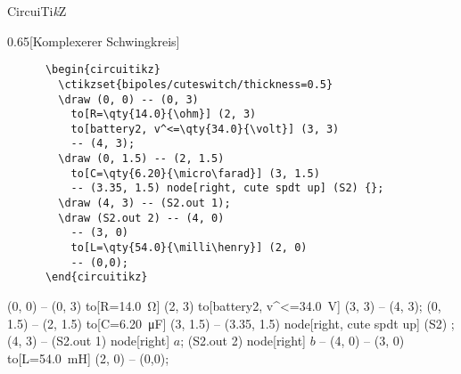 \begin{frame}[fragile]{CircuiTi\textit{k}Z}
  \begin{CodeExample}{0.65}[Komplexerer Schwingkreis]
    \begin{verbatim}
      \begin{circuitikz}
        \ctikzset{bipoles/cuteswitch/thickness=0.5}
        \draw (0, 0) -- (0, 3)
          to[R=\qty{14.0}{\ohm}] (2, 3)
          to[battery2, v^<=\qty{34.0}{\volt}] (3, 3)
          -- (4, 3);
        \draw (0, 1.5) -- (2, 1.5)
          to[C=\qty{6.20}{\micro\farad}] (3, 1.5)
          -- (3.35, 1.5) node[right, cute spdt up] (S2) {};
        \draw (4, 3) -- (S2.out 1);
        \draw (S2.out 2) -- (4, 0)
          -- (3, 0)
          to[L=\qty{54.0}{\milli\henry}] (2, 0)
          -- (0,0);
      \end{circuitikz}
    \end{verbatim}
  \CodeResult
    \begin{circuitikz}
        \draw (0, 0) -- (0, 3)
          to[R=\qty{14.0}{\ohm}] (2, 3)
          to[battery2, v^<=\qty{34.0}{\volt}] (3, 3)
          -- (4, 3);
        \draw (0, 1.5) -- (2, 1.5)
          to[C=\qty{6.20}{\micro\farad}] (3, 1.5)
          -- (3.35, 1.5) node[right, cute spdt up] (S2) {};
        \draw (4, 3) -- (S2.out 1) node[right] {$a$};
        \draw (S2.out 2) node[right] {$b$} -- (4, 0)
          -- (3, 0)
          to[L=\qty{54.0}{\milli\henry}] (2, 0)
          -- (0,0);
     \end{circuitikz}
  \end{CodeExample}
\end{frame}
